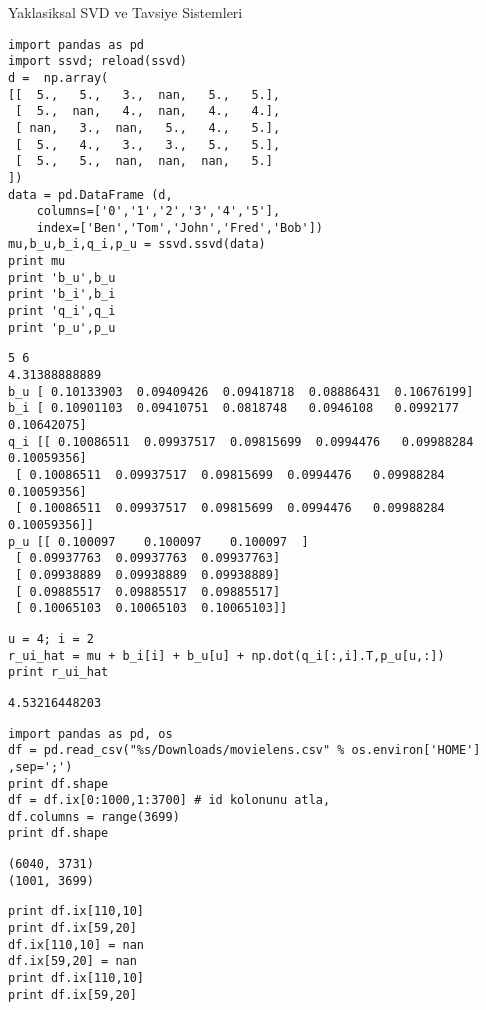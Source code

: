 \documentclass[12pt,fleqn]{article}\usepackage{../common}
\begin{document}
Yaklasiksal SVD ve Tavsiye Sistemleri

\begin{verbatim}
import pandas as pd
import ssvd; reload(ssvd)
d =  np.array(
[[  5.,   5.,   3.,  nan,   5.,   5.],
 [  5.,  nan,   4.,  nan,   4.,   4.],
 [ nan,   3.,  nan,   5.,   4.,   5.],
 [  5.,   4.,   3.,   3.,   5.,   5.],
 [  5.,   5.,  nan,  nan,  nan,   5.]
])
data = pd.DataFrame (d,
    columns=['0','1','2','3','4','5'],
    index=['Ben','Tom','John','Fred','Bob'])
mu,b_u,b_i,q_i,p_u = ssvd.ssvd(data)
print mu
print 'b_u',b_u
print 'b_i',b_i
print 'q_i',q_i
print 'p_u',p_u
\end{verbatim}

\begin{verbatim}
5 6
4.31388888889
b_u [ 0.10133903  0.09409426  0.09418718  0.08886431  0.10676199]
b_i [ 0.10901103  0.09410751  0.0818748   0.0946108   0.0992177   0.10642075]
q_i [[ 0.10086511  0.09937517  0.09815699  0.0994476   0.09988284  0.10059356]
 [ 0.10086511  0.09937517  0.09815699  0.0994476   0.09988284  0.10059356]
 [ 0.10086511  0.09937517  0.09815699  0.0994476   0.09988284  0.10059356]]
p_u [[ 0.100097    0.100097    0.100097  ]
 [ 0.09937763  0.09937763  0.09937763]
 [ 0.09938889  0.09938889  0.09938889]
 [ 0.09885517  0.09885517  0.09885517]
 [ 0.10065103  0.10065103  0.10065103]]
\end{verbatim}


\begin{verbatim}
u = 4; i = 2
r_ui_hat = mu + b_i[i] + b_u[u] + np.dot(q_i[:,i].T,p_u[u,:])
print r_ui_hat
\end{verbatim}

\begin{verbatim}
4.53216448203
\end{verbatim}


\begin{verbatim}
import pandas as pd, os
df = pd.read_csv("%s/Downloads/movielens.csv" % os.environ['HOME'] ,sep=';')
print df.shape
df = df.ix[0:1000,1:3700] # id kolonunu atla,
df.columns = range(3699)
print df.shape
\end{verbatim}

\begin{verbatim}
(6040, 3731)
(1001, 3699)
\end{verbatim}

\begin{verbatim}
print df.ix[110,10]
print df.ix[59,20]
df.ix[110,10] = nan
df.ix[59,20] = nan
print df.ix[110,10]
print df.ix[59,20]
\end{verbatim}
\end{document}
